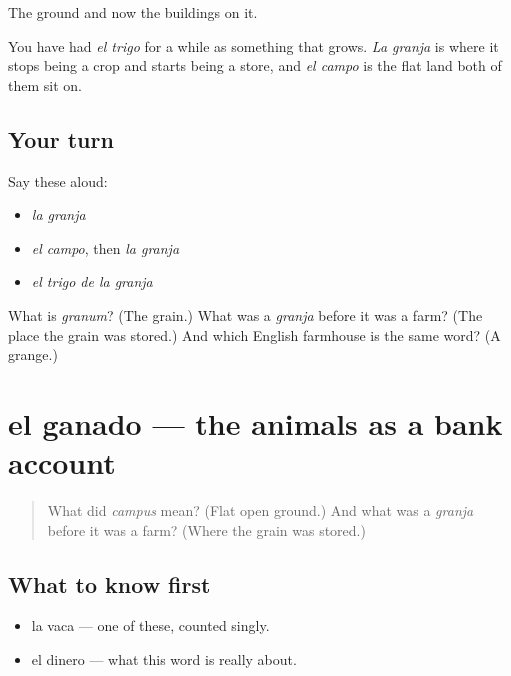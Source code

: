 \begin{grammarlens}[title={What you've built}]
The ground and now the buildings on it.

You have had \emph{el trigo} for a while as something that grows. \emph{La granja} is where it stops being a crop and starts being a store, and \emph{el campo} is the flat land both of them sit on.
\end{grammarlens}

\subsection*{Your turn}
Say these aloud:

\begin{itemize}
\raggedright
  \item \emph{la granja}
  \item \emph{el campo}, then \emph{la granja}
  \item \emph{el trigo de la granja}
\end{itemize}

\begin{tcolorbox}[breakable,colback=teal!4,colframe=teal!35!black,title={Before you move on}]
What is \emph{granum}? (The grain.) What was a \emph{granja} before it was a farm? (The place the grain was stored.) And which English farmhouse is the same word? (A grange.)
\end{tcolorbox}
\section[el ganado]{el ganado — the animals as a bank account}

\label{lesson:ES-C299-ganado}



\begin{quote}
What did \emph{campus} mean? (Flat open ground.) And what was a \emph{granja} before it was a farm? (Where the grain was stored.)
\end{quote}

\subsection*{What to know first}
\begin{itemize}
\raggedright
  \item la vaca — one of these, counted singly.
  \item el dinero — what this word is really about.
\end{itemize}

